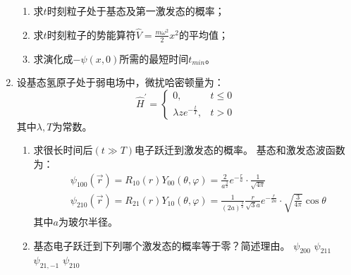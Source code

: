 \begin{enumerate}
\begin{enumerate}
\item 
求$t$时刻粒子处于基态及第一激发态的概率；

\item 
求$t$时刻粒子的势能算符$\hat{V}=\frac{m\omega^2}{2}x^2$的平均值；

\item 
求演化成$-\psi(x,0)$所需的最短时间$t_{min}$。
\end{enumerate}



\item 
设基态氢原子处于弱电场中，微扰哈密顿量为：
$$
\hat{H} ^{\prime} =\begin{cases}0,&t\le0\\
\lambda ze^{-\frac{t}{T}},&t>0
\end{cases}
$$
其中$  \lambda,T $为常数。
\begin{enumerate}
	\item
求很长时间后$(t\gg T)$电子跃迁到激发态的概率。
基态和激发态波函数为：
$$
\begin{aligned}
	&\psi_{100}(\vec{r})=R_{10}(r)Y_{00}(\theta,\varphi)=\frac{2}{a^{\frac{3}{2}}}e^{-\frac{r}{a}} \cdot \frac{1}{\sqrt{4\pi}} 
	\\ 
	&\psi_{210}(\vec{r})=R_{21}(r)Y_{10}(\theta,\varphi)=\frac{1}{(2a)^{\frac{3}{2}}}\frac{r}{\sqrt3a}e^{-\frac{r}{2a}} \cdot \sqrt{\frac{3}{4\pi}}\cos\theta 
\end{aligned}
$$
其中$  a  $为玻尔半径。
\item 
基态电子跃迁到下列哪个激发态的概率等于零？简述理由。
\fourchoices
{$\psi_{200}$}
{$\psi_{211}$}
{$\psi_{21,-1}$}
{$\psi_{210}$}



\end{enumerate}
\end{enumerate}
